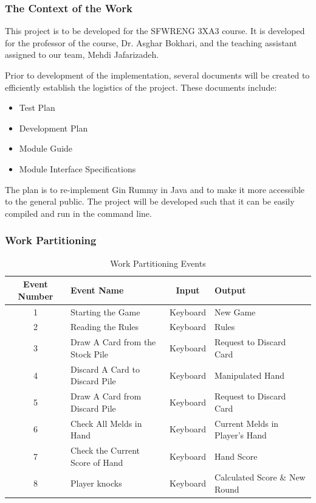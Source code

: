 \documentclass[12pt, titlepage]{article}
\begin{document}
\subsubsection{The Context of the Work}
This project is to be developed for the SFWRENG 3XA3 course. It is developed for the professor of the course, Dr. Asghar Bokhari, and the teaching assistant assigned to our team, Mehdi Jafarizadeh.

Prior to development of the implementation, several documents will be created to efficiently establish the logistics of the project. These documents include:
\begin{itemize}
    \item Test Plan
    \item Development Plan
    \item Module Guide
    \item Module Interface Specifications
\end{itemize}

The plan is to re-implement Gin Rummy in Java and to make it more accessible to the general public. The project will be developed such that it can be easily compiled and run in the command line.

\subsubsection{Work Partitioning}
\begin{table}[H]
\caption{Work Partitioning Events}
    \centering
    \begin{tabular}{|c|p{3.5cm}|c|p{3.5cm}|}
    \hline
    \textbf{Event Number} & \centering\textbf{Event Name} & \textbf{Input} & \textbf{Output} \\
    \hline
    1 & Starting the Game & Keyboard & New Game \\
    \hline
    2 & Reading the Rules & Keyboard & Rules \\
    \hline
    3 & Draw A Card from the Stock Pile & Keyboard & Request to Discard Card \\
    \hline
    4 & Discard A Card to Discard Pile & Keyboard & Manipulated Hand \\
    \hline
    5 & Draw A Card from Discard Pile & Keyboard & Request to Discard Card \\
    \hline
    6 & Check All Melds in Hand & Keyboard & Current Melds in Player's Hand \\
    \hline
    7 & Check the Current Score of Hand & Keyboard & Hand Score \\
    \hline
    8 & Player knocks & Keyboard & Calculated Score \& New Round \\
    \hline
    \end{tabular}
\end{table}
\end{document}
